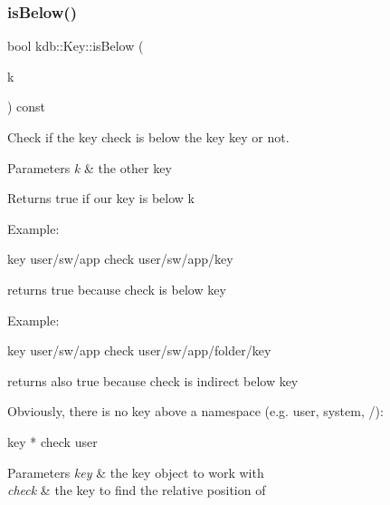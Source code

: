 \subsubsection{\texorpdfstring{is\+Below()}{isBelow()}}
{\footnotesize\ttfamily bool kdb\+::\+Key\+::is\+Below (\begin{DoxyParamCaption}\item[{const \hyperlink{classkdb_1_1Key}{Key} \&}]{k }\end{DoxyParamCaption}) const\hspace{0.3cm}{\ttfamily [inline]}}



Check if the key check is below the key key or not. 


\begin{DoxyParams}{Parameters}
{\em k} & the other key \\
\hline
\end{DoxyParams}
\begin{DoxyReturn}{Returns}
true if our key is below k
\end{DoxyReturn}
Example\+: \begin{DoxyVerb}key user/sw/app
check user/sw/app/key
\end{DoxyVerb}


returns true because check is below key

Example\+: \begin{DoxyVerb}key user/sw/app
check user/sw/app/folder/key
\end{DoxyVerb}


returns also true because check is indirect below key

Obviously, there is no key above a namespace (e.\+g. user, system, /)\+:

\begin{DoxyVerb}key *
check user
\end{DoxyVerb}



\begin{DoxyParams}{Parameters}
{\em key} & the key object to work with \\
\hline
{\em check} & the key to find the relative position of \\
\hline
\end{DoxyParams}

